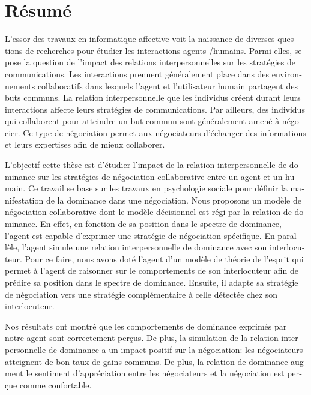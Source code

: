 \begingroup
\let\cleardoublepage\relax
\let\cleardoublepage\relax


\chapter*{Résumé}
\begin{otherlanguage}{french}
L'essor des travaux en informatique affective voit la naissance de diverses questions de recherches pour étudier les interactions agents /humains. Parmi elles, se pose la question de l'impact des relations interpersonnelles sur les stratégies de communications. 
Les interactions prennent généralement place dans des environnements collaboratifs dans lesquels l'agent et l'utilisateur humain partagent des buts communs. La relation interpersonnelle que les individus créent durant leurs interactions affecte leurs stratégies de communications. Par ailleurs, des individus qui collaborent pour atteindre un but commun sont généralement amené à négocier. Ce type de négociation permet aux négociateurs d'échanger des informations et leurs expertises afin de mieux collaborer.

L'objectif cette thèse est d'étudier l'impact de la relation interpersonnelle de dominance sur les stratégies de négociation collaborative entre un agent et un humain. 
Ce travail se base sur les travaux en psychologie sociale pour définir la manifestation de la dominance dans une négociation.
Nous proposons un modèle de négociation collaborative dont le modèle décisionnel est régi par la relation de dominance.
En effet, en fonction de sa position dans le spectre de dominance, l'agent est capable d'exprimer une stratégie de négociation spécifique.
En parallèle, l'agent simule une relation interpersonnelle de dominance avec son interlocuteur. Pour ce faire, nous avons doté l'agent d'un modèle de théorie de l'esprit qui permet à l'agent de raisonner sur le comportements de son interlocuteur afin de prédire sa position dans le spectre de dominance. Ensuite, il adapte sa stratégie de négociation vers une stratégie complémentaire à celle détectée chez son interlocuteur. 

Nos résultats ont montré que les comportements de dominance exprimés par notre agent sont correctement perçus. De plus, la simulation de la relation interpersonnelle de dominance a un impact positif sur la négociation: les négociateurs atteignent de bon taux de gains communs. De plus, la relation de dominance augment le sentiment d'appréciation entre les négociateurs et la négociation est perçue comme confortable.

\end{otherlanguage}


